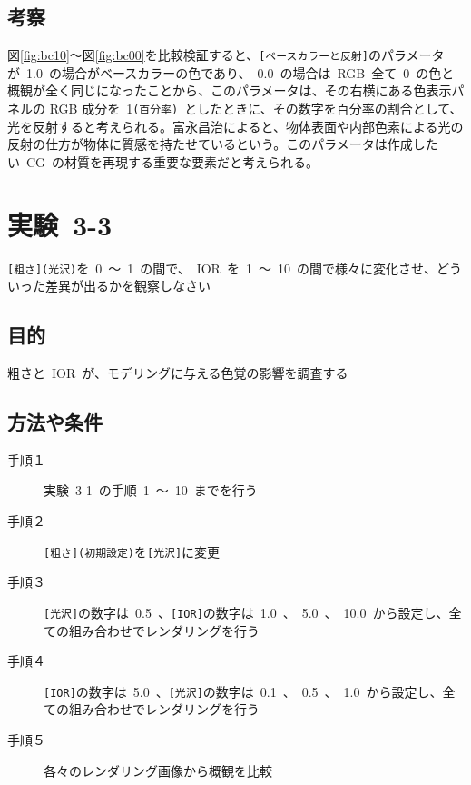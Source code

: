 \documentclass[a4j]{jarticle}
\begin{document}
\subsection{考察}
%
図\ref{fig:bc10}～図\ref{fig:bc00}を比較検証すると、\verb|[ベースカラーと反射]|のパラメータが\ 1.0\ の場合がベースカラーの色であり、\ 0.0\ の場合は\ RGB\ 全て\ 0\ の色と概観が全く同じになったことから、このパラメータは、その右横にある色表示パネルの RGB 成分を\ 1\verb|(百分率)|\ としたときに、その数字を百分率の割合として、光を反射すると考えられる。富永昌治によると、物体表面や内部色素による光の反射の仕方が物体に質感を持たせているという\cite{tominaga}。このパラメータは作成したい\ CG\ の材質を再現する重要な要素だと考えられる。
%

\newpage
\section{実験\ 3-3}
\verb|[粗さ](光沢)|を\ 0\ ～\ 1\ の間で、\ IOR\ を\ 1\ ～\ 10\ の間で様々に変化させ、どういった差異が出るかを観察しなさい
\subsection{目的}
%
粗さと\ IOR\ が、モデリングに与える色覚の影響を調査する
%
\subsection{方法や条件}
%
\begin{description}
  \item[手順１] 実験\ 3-1\ の手順\ 1\ ～\ 10\ までを行う
  \item[手順２] \verb|[粗さ](初期設定)|を\verb|[光沢]|に変更
  \item[手順３] \verb|[光沢]|の数字は\ 0.5\ 、\verb|[IOR]|の数字は\ 1.0\ 、\ 5.0\ 、\ 10.0\ から設定し、全ての組み合わせでレンダリングを行う
  \item[手順４] \verb|[IOR]|の数字は\ 5.0\ 、\verb|[光沢]|の数字は\ 0.1\ 、\ 0.5\ 、\ 1.0\ から設定し、全ての組み合わせでレンダリングを行う
  \item[手順５] 各々のレンダリング画像から概観を比較
\end{description}
%
\end{document}
